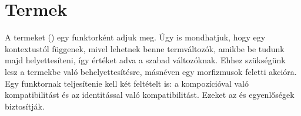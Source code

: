 \section{Termek}

A termeket () egy funktorként adjuk meg. Úgy is mondhatjuk, hogy egy kontextustól függenek, mivel lehetnek benne termváltozók, amikbe be tudunk majd helyettesíteni, így értéket adva a szabad változóknak. Ehhez szükségünk lesz a termekbe való behelyettesítésre, másnéven egy morfizmusok feletti akcióra. Egy funktornak teljesítenie kell két feltételt is: a kompozícióval való kompatibilitást és az identitással való kompatibilitást. Ezeket az  és  egyenlőségek biztosítják.
\begin{code}%
%
\>[6]%
\>[12]\AgdaSymbol{:}\AgdaSpace{}%
\AgdaSpace{}%
\AgdaSpace{}%
\AgdaSpace{}%
\<%
\\
%
\>[6]\AgdaSpace{}%
\AgdaSymbol{:}\AgdaSpace{}%
\AgdaSpace{}%
\AgdaSymbol{\}}\AgdaSpace{}%
\AgdaSpace{}%
\AgdaSpace{}%
\AgdaSpace{}%
\AgdaSpace{}%
\AgdaSpace{}%
\AgdaSpace{}%
\AgdaSpace{}%
\AgdaSpace{}%
\AgdaSpace{}%
\<%
\\
%
\>[6]%
\>[12]\AgdaSymbol{:}%
\>[148I]\AgdaSpace{}%
\AgdaSpace{}%
\AgdaSymbol{\}\{}\AgdaSpace{}%
\AgdaSymbol{:}\AgdaSpace{}%
\AgdaSpace{}%
\AgdaSymbol{\}\{}\AgdaSpace{}%
\AgdaSymbol{:}\AgdaSpace{}%
\AgdaSpace{}%
\AgdaSpace{}%
\AgdaSymbol{\}\{}\AgdaSpace{}%
\AgdaSymbol{:}\AgdaSpace{}%
\AgdaSpace{}%
\AgdaSpace{}%
\AgdaSymbol{\}}\<%
\\
\>[.][@{}l@{}]\<[148I]%
\>[14]\AgdaSpace{}%
\AgdaSpace{}%
\AgdaOperator{\AgdaField{[}}\AgdaSpace{}%
\AgdaSpace{}%
\AgdaSpace{}%
\AgdaSpace{}%
\AgdaOperator{\AgdaField{]ᵗ}}\AgdaSpace{}%
\AgdaSpace{}%
\AgdaSpace{}%
\AgdaOperator{\AgdaField{[}}\AgdaSpace{}%
\AgdaSpace{}%
\AgdaOperator{\AgdaField{]ᵗ}}\AgdaSpace{}%
\AgdaOperator{\AgdaField{[}}\AgdaSpace{}%
\AgdaSpace{}%
\AgdaOperator{\AgdaField{]ᵗ}}\<%
\\
%
\>[6]\AgdaSpace{}%
\AgdaSymbol{:}\AgdaSpace{}%
\AgdaSymbol{\}\{}\AgdaSpace{}%
\AgdaSymbol{:}\AgdaSpace{}%
\AgdaSpace{}%
\AgdaSymbol{\}}\AgdaSpace{}%
\AgdaSpace{}%
\AgdaSpace{}%
\AgdaOperator{\AgdaField{[}}\AgdaSpace{}%
\AgdaSpace{}%
\AgdaOperator{\AgdaField{]ᵗ}}\AgdaSpace{}%
\AgdaSpace{}%
\<%
\end{code}
